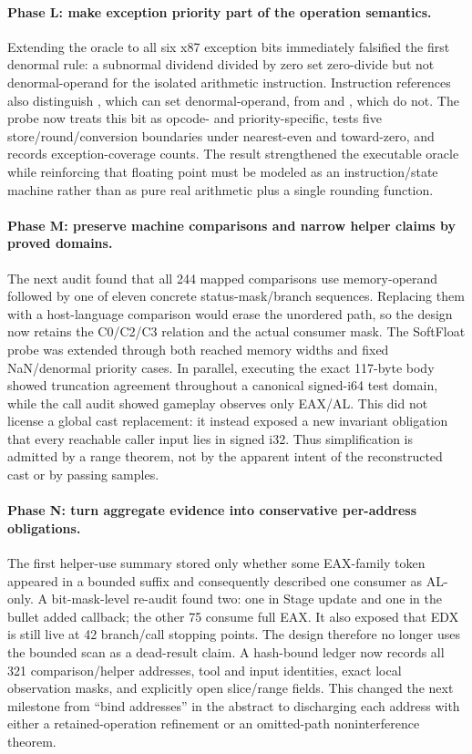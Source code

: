 \paragraph{Phase L: make exception priority part of the operation semantics.}
Extending the oracle to all six x87 exception bits immediately falsified the
first denormal rule: a subnormal dividend divided by zero set zero-divide but
not denormal-operand for the isolated arithmetic instruction.  Instruction
references also distinguish , which can set denormal-operand,
from  and , which do not.  The probe now treats this bit
as opcode- and priority-specific, tests five store/round/conversion boundaries
under nearest-even and toward-zero, and records exception-coverage counts.  The
result strengthened the executable oracle while reinforcing that floating
point must be modeled as an instruction/state machine rather than as pure real
arithmetic plus a single rounding function.

\paragraph{Phase M: preserve machine comparisons and narrow helper claims by
proved domains.}
The next audit found that all 244 mapped comparisons use memory-operand
 followed by one of eleven concrete status-mask/branch sequences.
Replacing them with a host-language comparison would erase the unordered path,
so the design now retains the C0/C2/C3 relation and the actual consumer mask.
The SoftFloat probe was extended through both reached memory widths and fixed
NaN/denormal priority cases.  In parallel, executing the exact 117-byte
 body showed truncation agreement throughout a canonical
signed-i64 test domain, while the call audit showed gameplay observes only
EAX/AL.  This did not license a global cast replacement: it instead exposed a
new invariant obligation that every reachable caller input lies in signed i32.
Thus simplification is admitted by a range theorem, not by the apparent intent
of the reconstructed cast or by passing samples.

\paragraph{Phase N: turn aggregate evidence into conservative per-address
obligations.}
The first helper-use summary stored only whether some EAX-family token appeared
in a bounded suffix and consequently described one consumer as AL-only.  A
bit-mask-level re-audit found two: one in Stage update and one in the bullet
added callback; the other 75 consume full EAX.  It also exposed that EDX is
still live at 42 branch/call stopping points.  The design therefore no longer
uses the bounded scan as a dead-result claim.  A hash-bound ledger now records
all 321 comparison/helper addresses, tool and input identities, exact local
observation masks, and explicitly open slice/range fields.  This changed the
next milestone from ``bind addresses'' in the abstract to discharging each
address with either a retained-operation refinement or an omitted-path
noninterference theorem.

